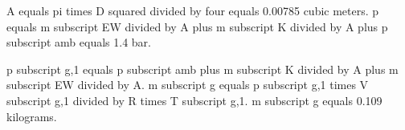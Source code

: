 A equals pi times D squared divided by four equals 0.00785 cubic meters.  
p equals m subscript EW divided by A plus m subscript K divided by A plus p subscript amb equals 1.4 bar.  

p subscript g,1 equals p subscript amb plus m subscript K divided by A plus m subscript EW divided by A.  
m subscript g equals p subscript g,1 times V subscript g,1 divided by R times T subscript g,1.  
m subscript g equals 0.109 kilograms.